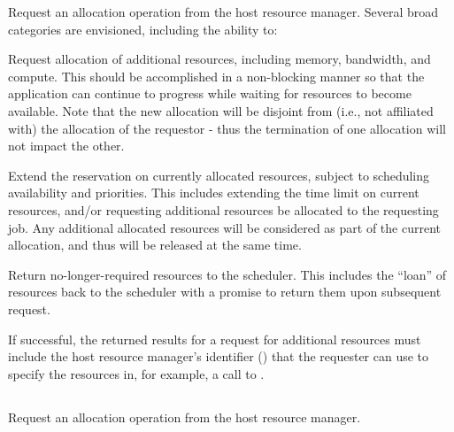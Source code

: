 \optattrend

\descr

Request an allocation operation from the host resource manager.
Several broad categories are envisioned, including the ability to:

\begin{compactitem}
%
\item Request allocation of additional resources, including memory, bandwidth, and compute.
This should be accomplished in a non-blocking manner so that the application can continue to progress while waiting for resources to become available.
Note that the new allocation will be disjoint from (i.e., not affiliated with) the allocation of the requestor - thus the termination of one allocation will not impact the other.
%
\item Extend the reservation on currently allocated resources, subject to scheduling availability and priorities.
This includes extending the time limit on current resources, and/or requesting additional resources be allocated to the requesting job.
Any additional allocated resources will be considered as part of the current allocation, and thus will be released at the same time.
%
\item Return no-longer-required resources to the scheduler.
This includes the ``loan'' of resources back to the scheduler with a promise to return them upon subsequent request.
\end{compactitem}

If successful, the returned results for a request for additional resources must include the host resource manager's identifier () that the requester can use to specify the resources in, for example, a call to .

\subsection{}

\summary

Request an allocation operation from the host resource manager.

\format


